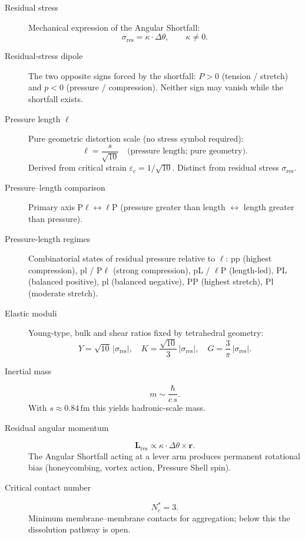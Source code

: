 \begin{description}
\item[Residual stress]
Mechanical expression of the Angular Shortfall:
\[
\sigma_{\mathrm{res}}=\kappa\cdot\Delta\theta,\qquad\kappa\neq 0.
\]

\item[Residual-stress dipole]
The two opposite signs forced by the shortfall:
$P>0$ (tension / stretch) and $p<0$ (pressure / compression).
Neither sign may vanish while the shortfall exists.

\item[Pressure length $\ell$]
Pure geometric distortion scale (no stress symbol required):
\[
\ell=\frac{s}{\sqrt{10}}\quad\text{(pressure length; pure geometry)}.
\]
Derived from critical strain $\varepsilon_c=1/\sqrt{10}$. Distinct from residual stress $\sigma_{\mathrm{res}}$.

\item[Pressure--length comparison]
Primary axis $\mathrm{P}\ell \leftrightarrow \ell\mathrm{P}$ (pressure greater than length $\leftrightarrow$ length greater than pressure).

\item[Pressure-length regimes]
Combinatorial states of residual pressure relative to $\ell$:
$\mathrm{pp}$ (highest compression), $\mathrm{pl}$ / $\mathrm{P}\ell$ (strong compression),
$\mathrm{pL}$ / $\ell\mathrm{P}$ (length-led), $\mathrm{PL}$ (balanced positive),
$\mathrm{pl}$ (balanced negative), $\mathrm{PP}$ (highest stretch), $\mathrm{Pl}$ (moderate stretch).

\item[Elastic moduli]
Young-type, bulk and shear ratios fixed by tetrahedral geometry:
\[
Y=\sqrt{10}\,|\sigma_{\mathrm{res}}|,\quad
K=\frac{\sqrt{10}}{3}\,|\sigma_{\mathrm{res}}|,\quad
G=\frac{3}{\pi}\,|\sigma_{\mathrm{res}}|.
\]

\item[Inertial mass]
\[
m\sim\frac{\hbar}{c\,s}.
\]
With $s\approx 0.84\,\mathrm{fm}$ this yields hadronic-scale mass.

\item[Residual angular momentum]
\[
\mathbf{L}_{\mathrm{res}}\propto\kappa\cdot\Delta\theta\times\mathbf{r}.
\]
The Angular Shortfall acting at a lever arm produces permanent rotational bias
(honeycombing, vortex action, Pressure Shell spin).

\item[Critical contact number]
\[
N_c^*=3.
\]
Minimum membrane--membrane contacts for aggregation; below this the dissolution
pathway is open.


\end{description}
